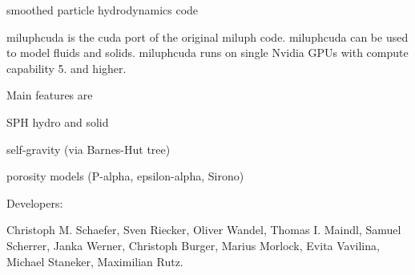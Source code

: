 smoothed particle hydrodynamics code

miluphcuda is the cuda port of the original miluph code. miluphcuda can be used to model fluids and solids. miluphcuda runs on single Nvidia G\+P\+Us with compute capability 5. and higher.

Main features are


\begin{DoxyItemize}
\item S\+PH hydro and solid
\item self-\/gravity (via Barnes-\/\+Hut tree)
\item porosity models (P-\/alpha, epsilon-\/alpha, Sirono)
\end{DoxyItemize}

Developers\+:

Christoph M. Schaefer, Sven Riecker, Oliver Wandel, Thomas I. Maindl, Samuel Scherrer, Janka Werner, Christoph Burger, Marius Morlock, Evita Vavilina, Michael Staneker, Maximilian Rutz. 